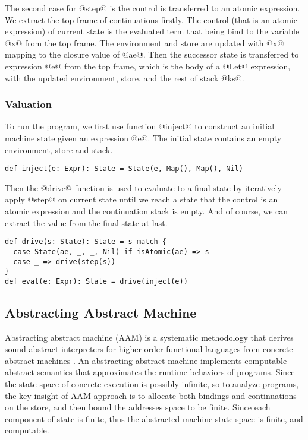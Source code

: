 \documentclass[acmsmall,review,anonymous]{acmart}\settopmatter{printfolios=true,printccs=false,printacmref=false}
\begin{document}
The second case for @step@ is the control is transferred to an atomic expression.
We extract the top frame of continuations firstly.
The control (that is an atomic expression) of current state is the evaluated term
that being bind to the variable @x@ from the top frame.
The environment and store are updated with @x@ mapping to the closure value of @ae@.
Then the successor state is transferred to expression @e@ from the top frame,
which is the body of a @Let@ expression, with the updated environment, store, and
the rest of stack @ks@.

\subsubsection{Valuation}

To run the program, we first use function @inject@ to construct an initial machine
state given an expression @e@. The initial state contains an empty environment, 
store and stack.
\begin{lstlisting}
def inject(e: Expr): State = State(e, Map(), Map(), Nil)
\end{lstlisting}

Then the @drive@ function is used to evaluate
to a final state by iteratively apply @step@ on current state until we reach a state
that the control is an atomic expression and the continuation stack is empty.
And of course, we can extract the value from the final state at last.

\begin{lstlisting}
def drive(s: State): State = s match {
  case State(ae, _, _, Nil) if isAtomic(ae) => s
  case _ => drive(step(s))
}
def eval(e: Expr): State = drive(inject(e))
\end{lstlisting}

\subsection{Abstracting Abstract Machine} \label{aam}
Abstracting abstract machine (AAM) is a systematic methodology that derives sound 
abstract interpreters for higher-order functional languages from concrete 
abstract machines \cite{van2012systematic, van2010abstracting}. 
An abstracting abstract machine implements computable abstract semantics that 
approximates the runtime behaviors of programs.
Since the state space of concrete execution is possibly infinite,
so to analyze programs, the key insight of AAM approach is to allocate both bindings
and continuations on the store, and then bound the addresses space to be finite.
Since each component of state is finite, 
thus the abstracted machine-state space is finite, and computable.
\end{document}
